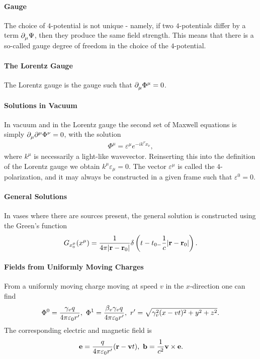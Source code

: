 \paragraph{Gauge}
The choice of $4$-potential is not unique - namely, if two $4$-potentials differ by a term $\del{\mu}{\Psi}$, then they produce the same field strength. This means that there is a so-called gauge degree of freedom in the choice of the $4$-potential.

\paragraph{The Lorentz Gauge}
The Lorentz gauge is the gauge such that $\del{\mu}{\Phi^{\mu}} = 0$.

\paragraph{Solutions in Vacuum}
In vacuum and in the Lorentz gauge the second set of Maxwell equations is simply $\del{\mu}{\del[\mu]{}{\Phi^{\nu}}} = 0$, with the solution
\begin{align*}
	\Phi^{\mu} = \varepsilon^{\mu}e^{-ik^{\nu}x_{\nu}},
\end{align*}
where $k^{\mu}$ is necessarily a light-like wavevector. Reinserting this into the definition of the Lorentz gauge we obtain $k^{\mu}\varepsilon_{\mu} = 0$. The vector $\varepsilon^{\mu}$ is called the $4$-polarization, and it may always be constructed in a given frame such that $\varepsilon^{0} = 0$.

\paragraph{General Solutions}
In vases where there are sources present, the general solution is constructed using the Green's function
\begin{align*}
	G_{x_{0}^{\mu}}(x^{\mu}) = \frac{1}{4\pi\abs{\vb{r} - \vb{r}_{0}}}\delta\left(t - t_{0 - }\frac{1}{c}\abs{\vb{r} - \vb{r}_{0}}\right).
\end{align*}

\paragraph{Fields from Uniformly Moving Charges}
From a uniformly moving charge moving at speed $v$ in the $x$-direction one can find
\begin{align*}
	\Phi^{0} = \frac{\gamma_{v}q}{4\pi\varepsilon_{0}r\p},\ \Phi^{1} = \frac{\beta_{v}\gamma_{v}q}{4\pi\varepsilon_{0}r\p},\ r\p = \sqrt{\gamma_{v}^{2}(x - vt)^{2} + y^{2} + z^{2}}.
\end{align*}
The corresponding electric and magnetic field is
\begin{align*}
	\vb{e} = \frac{q}{4\pi\varepsilon_{0}r\p}(\vb{r} - \vb{v}t),\ \vb{b} = \frac{1}{c^{2}}\vb{v}\times\vb{e}.
\end{align*}